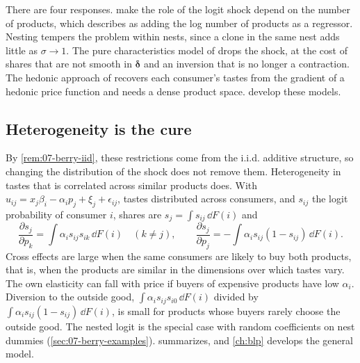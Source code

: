There are four responses. \citet{AckerbergRysman2005} make the role of the logit shock depend on the number of
products, which \citet{Einav2007} describes as adding the log number of products as a regressor. Nesting tempers
the problem within nests, since a clone in the same nest adds little as $\sigma \to 1$. The pure characteristics
model of \citet{BerryPakes2007} drops the shock, at the cost of shares that are not smooth in $\boldsymbol\delta$
and an inversion that is no longer a contraction. The hedonic approach of \citet{BajariBenkard2005} recovers each
consumer's tastes from the gradient of a hedonic price function and needs a dense product space.
 develop these models.

\subsection{Heterogeneity is the cure}\label{sec:07-limits-cure}

By \cref{rem:07-berry-iid}, these restrictions come from the i.i.d. additive structure, so changing the distribution
of the shock does not remove them. Heterogeneity in tastes that is correlated across similar products does. With
$u_{ij} = x_j\beta_i - \alpha_ip_j + \xi_j + \epsilon_{ij}$, tastes distributed across consumers, and $s_{ij}$ the
logit probability of consumer $i$, shares are $s_j = \int s_{ij}\,\dd F(i)$ and
\begin{equation*}
\frac{\partial s_j}{\partial p_k} = \int \alpha_i s_{ij}s_{ik}\,\dd F(i) \quad (k \ne j),
\qquad
\frac{\partial s_j}{\partial p_j} = -\int \alpha_i s_{ij}(1 - s_{ij})\,\dd F(i).
\end{equation*}
Cross effects are large when the same consumers are likely to buy both products, that is, when the products are
similar in the dimensions over which tastes vary. The own elasticity can fall with price if buyers of expensive
products have low $\alpha_i$. Diversion to the outside good, $\int\alpha_i s_{ij}s_{i0}\,\dd F(i)$ divided by
$\int\alpha_i s_{ij}(1-s_{ij})\,\dd F(i)$, is small for products whose buyers rarely choose the outside good. The
nested logit is the special case with random coefficients on nest dummies (\cref{sec:07-berry-examples}).
 summarizes, and \cref{ch:blp} develops the general model.

